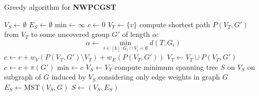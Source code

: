 \documentclass[a4paper,11pt]{article}
\begin{document}
\begin{algorithm}
	\caption{Greedy algorithm for \textbf{NWPCGST}}\label{alg:greedy}
	\begin{algorithmic}[1]
        \State $V_S\gets \emptyset$
        \State $E_S\gets\emptyset$
        \State $\mbox{min}\gets \infty$
            \State $c\gets 0$
            \State $V_T\gets \{v\}$
                \State compute shortest path $P(V_T,G')$ from $V_T$ to some uncovered group $G'$ of length $\alpha$:
                $$\alpha \gets \min_{i\in[k]: G_i\cap V_i = \emptyset }d(T,G_i)$$
                    \State $c\gets c + w_V(P(V_T,G')\setminus V_T) + w_E(P(V_T,G'))$
                    \State $V_T\gets V_T \cup P(V_T,G')$
                \Else
                    \State $c\gets c + \pi(G')$
                \EndIf
            \EndWhile
                \State $\mbox{min}\gets c$
                \State $V_S\gets V_T$
            \EndIf
        \EndFor
        \State compute minimum spanning tree $S$ on $V_S$ on subgraph of $G$ induced by $V_S$ considering only edge weights in graph $G$
        \State $E_S \gets \mbox{MST}(V_S,G)$
        \Return $S\gets (V_S,E_S)$
		\EndProcedure
	\end{algorithmic}
\end{algorithm}



\end{document}
